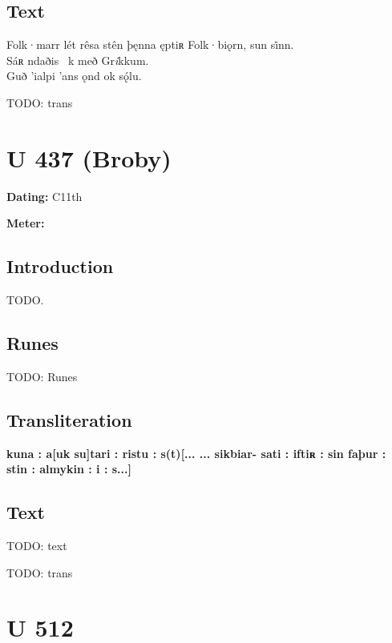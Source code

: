 \subsection{Text}

\bpg\bpa[0]%
\startsub Folk·marr lét rêsa stên þęnna ęptiʀ Folk·biǫrn, sun si̇nn.\endsub \\
Sáʀ ndaðis \hld\ k með Gr\emph{i}kkum. \\
Guð ’ialpi ’ans ǫnd ok sǫ́lu.\epa

\bpb TODO: trans\epb\epg

\sectionline\clearpage


\section{U 437 (Broby)}

\begin{flushright}%
\textbf{Dating:} C11th

\textbf{Meter:} \Fornyrdislag
\end{flushright}%

\subsection{Introduction}

TODO.

\subsection{Runes}

TODO: Runes%

\subsection{Transliteration}

\textbf{kuna : a[uk su]tari : ristu : s(t)[... ... sikbiar- sati : iftiʀ : sin faþur : stin : almykin : i : s...]}

\subsection{Text}

\bpg\bpa[0]%
TODO: text\epa

\bpb TODO: trans\epb\epg

\sectionline\clearpage


\section{U 512}

